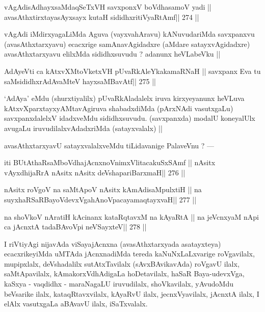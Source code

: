 \begin{shl}
vAgAdisAdhayxsaMdaqSeTxVH \footnotemark[1]savxponxV \footnotemark[2]boVdhasamoV yadi ||
avasAthxtirxtayasAyxsayx kutaH sididhxritiVyaRtAmf\hfill || 274 ||
\end{shl}

\begin{artha}
vAgAdi iMdirxyagaLiMda Aguva (vayxvahAravu) kANuvudariMda savxpanxvu (avasAthxtarxyavu) ecacxrige samAnavAgidadxre (aMdare satayxvAgidadxre) avasAthxtarxyavu elilxMda sididhxsuvudu ? adanunx heVLabeVku ||
\end{artha}

\begin{shl}
AdAyeVti ca kAtxvXMtoVketxVH pUvaRkAleYkakamaRNaH ||
savxpanx Eva tu saMsididhxrAdAvaMteV hayxsaMBavAtf\hfill || 275 ||
\end{shl}

\begin{artha}
`AdAya' eMdu (shurxtiyalilx) pUvaRkAladalelx iruva kirxyeyanunx heVLuva kAtxvXparxtayxyAMtavAgiruva shabadxdiMda (pArxNAdi vasutxgaLu) savxpanxdalelxV idadxveMdu sididhxsuvudu. (savxpanxda) modalU koneyalUlx avugaLu iruvudilalxvAdadxriMda (satayxvalalx) ||
\end{artha}

\begin{artha}
avasAthxtarxyavU satayxvalalxveMdu tiLidavanige PalaveVnu ? ---
\end{artha}

\begin{shl}
iti BUtAthaRsaMboVdhajAcnxnoVnimxVlitacakuSxSAmf ||
nAsitx vAyxdhijaRrA nAsitx nAsitx deVshapariBarxmaH\hfill || 276 ||
\end{shl}

\begin{shl}
nAsitx roVgoV na saMtApoV nAsitx kAmAdisaMpulxtiH ||
na suyxhaRSaRBayoVdevxVgahAnoVpacayamaqtayxvaH\hfill || 277 ||
\end{shl}

\begin{shl}
na shoVkoV nAratiH kAcinanx kataRqtavxM na kAyaRtA ||
na jeVcnxyaM nApi ca jAcnxtA tadaBAvoV\s pi neVSayxteV\hfill || 278 ||
\end{shl}

\begin{artha}
I riVtiyAgi nijavAda viSayajAcnxna (avasAthxtarxyada asatayxteya) ecacxrikeyiMda uMTAda jAcnxnadiMda tereda kaNuNxLaLxvarige roVgavilalx, mupipxlalx, deVshadalilx sutAtxTavilalx (sAvxBAvikavAda) roVgavU ilalx, saMtApavilalx, kAmakorxVdhAdigaLa hoDetavilalx, haSaR Baya-udevxVga, kaSxya - vaqdidhx - maraNagaLU iruvudilalx, shoVkavilalx, yAvudoMdu beVsarike ilalx, kataqRtavxvilalx, kAyaRvU ilalx, jecnxVyavilalx, jAcnxtA ilalx, I elAlx vasutxgaLa aBAvavU ilalx, iSaTxvalalx.
\end{artha}

